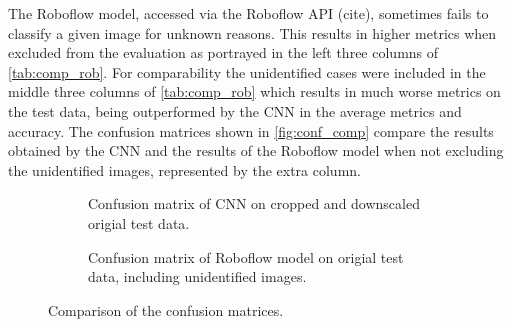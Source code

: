 \noindent 
The Roboflow model, accessed via the Roboflow API (cite), sometimes fails to classify a given image for unknown reasons. This results in higher metrics when excluded from the evaluation as portrayed in the left three columns of \autoref{tab:comp_rob}. For comparability the unidentified cases were included in the middle three columns of \autoref{tab:comp_rob} which results in much worse metrics on the test data, being outperformed by the CNN in the average metrics and accuracy. 
The confusion matrices shown in \autoref{fig:conf_comp} compare the results obtained by the CNN and the results of the Roboflow model when not excluding the unidentified images, represented by the extra column.
\begin{figure}[H]
    \centering
    \begin{subfigure}{0.49\textwidth}
        \centering
        \caption{Confusion matrix of CNN on cropped and downscaled origial test data.}
    \end{subfigure}
    \hfill
    \begin{subfigure}{0.49\textwidth}
        \centering
        \caption{Confusion matrix of Roboflow model on origial test data, including unidentified images.}
    \end{subfigure}
    \caption{Comparison of the confusion matrices.}
    \label{fig:conf_comp}
\end{figure}
\noindent
